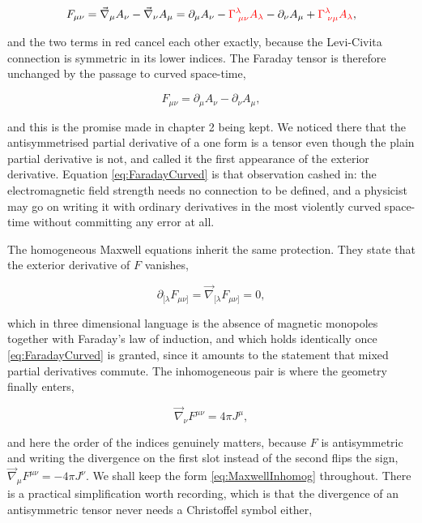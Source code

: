         \begin{align*}
            F_{\mu\nu} = \Vec{\nabla}_{\mu}A_{\nu} - \Vec{\nabla}_{\nu}A_{\mu} = \partial_{\mu}A_{\nu} - {\color{red}\Gamma^{\lambda}_{\;\mu\nu}A_{\lambda}} - \partial_{\nu}A_{\mu} + {\color{red}\Gamma^{\lambda}_{\;\nu\mu}A_{\lambda}},
        \end{align*}

        and the two terms in red cancel each other exactly, because the Levi-Civita connection is symmetric in its lower indices. The Faraday tensor is therefore unchanged by the passage to curved space-time,

        \begin{equation}\label{eq:FaradayCurved}
            F_{\mu\nu} = \partial_{\mu}A_{\nu} - \partial_{\nu}A_{\mu},
        \end{equation}

        and this is the promise made in chapter 2 being kept. We noticed there that the antisymmetrised partial derivative of a one form is a tensor even though the plain partial derivative is not, and called it the first appearance of the exterior derivative. Equation \ref{eq:FaradayCurved} is that observation cashed in: the electromagnetic field strength needs no connection to be defined, and a physicist may go on writing it with ordinary derivatives in the most violently curved space-time without committing any error at all.

        The homogeneous Maxwell equations inherit the same protection. They state that the exterior derivative of $F$ vanishes,

        \begin{equation}\label{eq:MaxwellHomog}
            \partial_{[\lambda}F_{\mu\nu]} = \Vec{\nabla}_{[\lambda}F_{\mu\nu]} = 0,
        \end{equation}

        which in three dimensional language is the absence of magnetic monopoles together with Faraday's law of induction, and which holds identically once \ref{eq:FaradayCurved} is granted, since it amounts to the statement that mixed partial derivatives commute. The inhomogeneous pair is where the geometry finally enters,

        \begin{equation}\label{eq:MaxwellInhomog}
            \Vec{\nabla}_{\nu}F^{\mu\nu} = 4\pi J^{\mu},
        \end{equation}

        and here the order of the indices genuinely matters, because $F$ is antisymmetric and writing the divergence on the first slot instead of the second flips the sign, $\Vec{\nabla}_{\mu}F^{\mu\nu} = -4\pi J^{\nu}$. We shall keep the form \ref{eq:MaxwellInhomog} throughout. There is a practical simplification worth recording, which is that the divergence of an antisymmetric tensor never needs a Christoffel symbol either,

